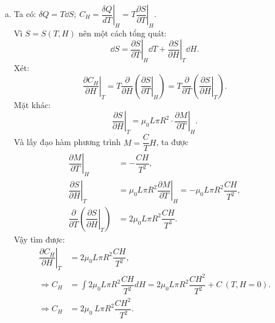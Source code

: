 \begin{loigiai}
\begin{enumerate}[1)]
\begin{enumerate}[a)]
            \item Ta có: $\delta {Q}={T \dd S};~{{{C}}_{{H}}}={{\left. \dfrac{\delta {Q}}{{dT}} \right|}_{{H}}}={{\left. {T}\dfrac{\partial {S}}{\partial {T}} \right|}_{{H}}}$.
            \\Vì ${S}={S}({T},{H})$ nên một cách tổng quát: \[{\dd S}={{\left. \dfrac{\partial {S}}{\partial {T}} \right|}_{{H}}}{\dd T}+{{\left. \dfrac{\partial {S}}{\partial {H}} \right|}_{{T}}}{\dd H}.\]
            Xét: 
            \[{{\left. \dfrac{\partial {{{C}}_{{H}}}}{\partial {H}} \right|}_{{T}}}={T}\dfrac{\partial }{\partial {H}}\left( {{\left. \dfrac{\partial {S}}{\partial {T}} \right|}_{{H}}} \right)={T}\dfrac{\partial }{\partial {T}}\left( {{\left. \dfrac{\partial S}{\partial {H}} \right|}_{{T}}} \right).\]
            Mặt khác: 
            \[{{\left. \dfrac{\partial {S}}{\partial {H}} \right|}_{{T}}}={{\mu }_{0}}{L}\pi {{{R}}^{2}}\cdot \left. \dfrac{\partial {M}}{\partial {T}}\right|_{H}.\]
            Và lấy đạo hàm phương trình ${M}=\dfrac{{C}}{{T}}{H}$, ta được 
            \[\begin{aligned}
                {{\left. \dfrac{\partial {M}}{\partial {T}} \right|}_{{H}}}&=-\dfrac{{CH}}{{{{T}}^{2}}},\\
                {{\left. \dfrac{\partial {S}}{\partial {H}} \right|}_{{T}}}&={{\left. {{\mu }_{0}}{L}\pi {{{R}}^{2}}\dfrac{\partial {M}}{\partial {T}} \right|}_{{H}}}=-{{\mu }_{0}}{L}\pi {{{R}}^{2}}\dfrac{{CH}}{{{{T}}^{2}}},\\
                \dfrac{\partial }{\partial {T}}\left( {{\left. \dfrac{\partial {S}}{\partial {H}} \right|}_{{T}}} \right)&=2{{\mu }_{0}}{L}\pi {{{R}}^{2}}\dfrac{{CH}}{{{{T}}^{3}}}.
            \end{aligned}\]
            Vậy tìm được: 
            \[\]
            \[\begin{aligned}
            {{\left. \dfrac{\partial {{{C}}_{{H}}}}{\partial {H}} \right|}_{{T}}} &=2{{\mu }_{0}}{L}\pi {{{R}}^{2}}\dfrac{{CH}}{{{{T}}^{2}}},\\
                \Rightarrow {{{C}}_{{H}}} &= \int{2}{{\mu }_{0}}{L}\pi {{{R}}^{2}}\dfrac{{CH}}{{{{T}}^{2}}}{dH} = 2{{\mu }_{0}}{L}\pi {{{R}}^{2}}\dfrac{{C}{{{H}}^{2}}}{~{{{T}}^{2}}}+{C}~({T},{H}=0). \\
                \Rightarrow {{{C}}_{{H}}} &= 2{{\mu }_{0}}~{L}\pi {{{R}}^{2}}\dfrac{{C}{{{H}}^{2}}}{~{{{T}}^{2}}}.
                \end{aligned}\]
                

\end{enumerate}
\end{enumerate}
\end{loigiai}
